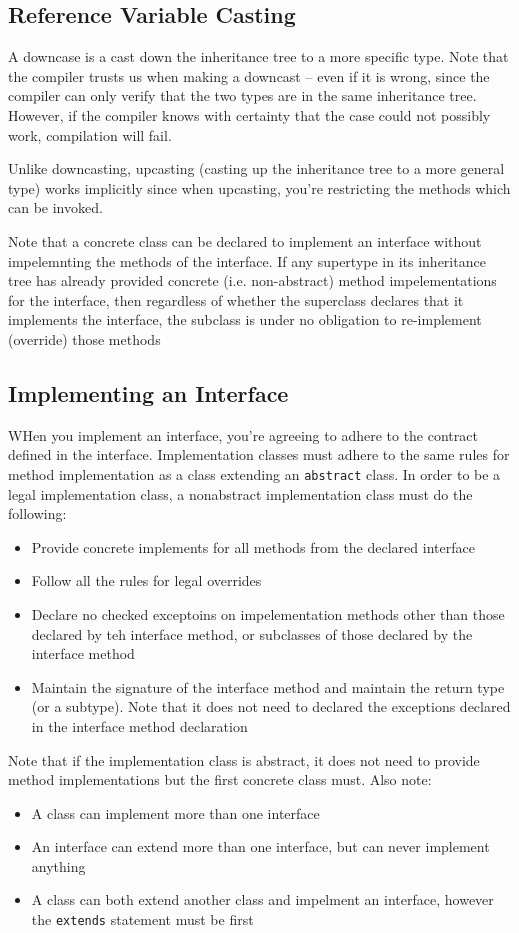 \subsection{Reference Variable Casting}
A downcase is a cast down the inheritance tree to a more specific type. Note 
that the compiler trusts us when making a downcast -- even if it is wrong, 
since the compiler can only verify that the two types are in the same 
inheritance tree. However, if the compiler knows with certainty that the case 
could not possibly work, compilation will fail.

Unlike downcasting, upcasting (casting up the inheritance tree to a more 
general type) works implicitly since when upcasting, you're restricting the 
methods which can be invoked.

Note that a concrete class can be declared to implement an interface without 
impelemnting the methods of the interface. If any supertype in its inheritance 
tree has already provided concrete (i.e. non-abstract) method impelementations 
for the interface, then regardless of whether the superclass declares that it
implements the interface, the subclass is under no obligation to re-implement 
(override) those methods

\subsection{Implementing an Interface}
WHen you implement an interface, you're agreeing to adhere to the contract 
defined in the interface. Implementation classes must adhere to the same rules 
for method implementation as a class extending an \verb#abstract# class. In
order to be a legal implementation class, a nonabstract implementation class 
must do the following:
\begin{itemize}
    \item Provide concrete implements for all methods from the declared 
    interface
    \item Follow all the rules for legal overrides
    \item Declare no checked exceptoins on impelementation methods other than 
    those declared by teh interface method, or subclasses of those declared by 
    the interface method
    \item Maintain the signature of the interface method and maintain the 
    return type (or a subtype). Note that it does not need to declared the 
    exceptions declared in the interface method declaration
\end{itemize}
Note that if the implementation class is abstract, it does not need to provide 
method implementations but the first concrete class must. Also note:
\begin{itemize}
    \item A class can implement more than one interface
    \item An interface can extend more than one interface, but can never 
    implement anything
    \item A class can both extend another class and impelment an interface, 
    however the \verb#extends# statement must be first
\end{itemize}

